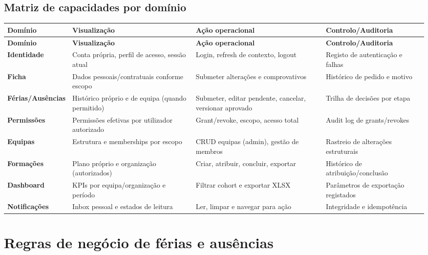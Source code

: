 \documentclass[11pt,a4paper,twoside]{article}
\newcommand{\tH}[1]{\textbf{\sffamily\small\color{white}#1}}
\newcommand{\theadrow}{\rowcolor{ACCENT}}
\begin{document}
\subsection{Matriz de capacidades por domínio}
\begin{longtable}{>{\small\bfseries}p{2.2cm} >{\small}p{4.1cm} >{\small}p{4.2cm} >{\small}p{3.2cm}}
\theadrow
\tH{Domínio} & \tH{Visualização} & \tH{Ação operacional} & \tH{Controlo/Auditoria} \\
\midrule
\endfirsthead
\theadrow
\tH{Domínio} & \tH{Visualização} & \tH{Ação operacional} & \tH{Controlo/Auditoria} \\
\midrule
\endhead
Identidade & Conta própria, perfil de acesso, sessão atual & Login, refresh de contexto, logout & Registo de autenticação e falhas \\
Ficha & Dados pessoais/contratuais conforme escopo & Submeter alterações e comprovativos & Histórico de pedido e motivo \\
Férias/Ausências & Histórico próprio e de equipa (quando permitido) & Submeter, editar pendente, cancelar, versionar aprovado & Trilha de decisões por etapa \\
Permissões & Permissões efetivas por utilizador autorizado & Grant/revoke, escopo, acesso total & Audit log de grants/revokes \\
Equipas & Estrutura e memberships por escopo & CRUD equipas (admin), gestão de membros & Rastreio de alterações estruturais \\
Formações & Plano próprio e organização (autorizados) & Criar, atribuir, concluir, exportar & Histórico de atribuição/conclusão \\
Dashboard & KPIs por equipa/organização e período & Filtrar cohort e exportar XLSX & Parâmetros de exportação registados \\
Notificações & Inbox pessoal e estados de leitura & Ler, limpar e navegar para ação & Integridade e idempotência \\
\bottomrule
\end{longtable}

\section{Regras de negócio de férias e ausências}
\end{document}
